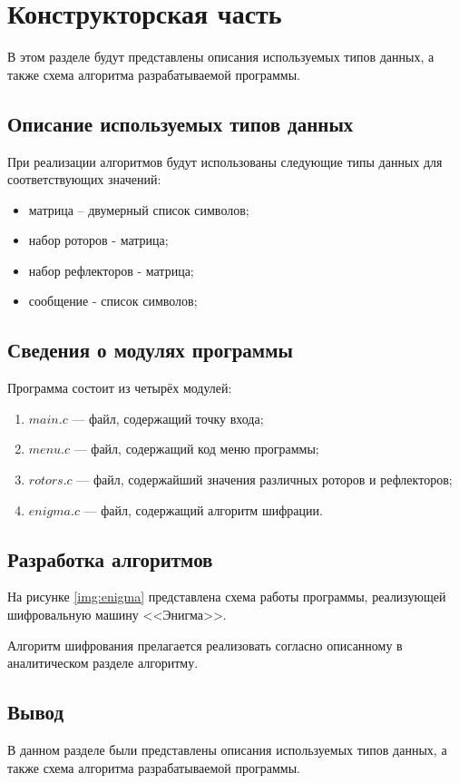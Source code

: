 \chapter{Конструкторская часть}
В этом разделе будут представлены описания используемых типов данных, а также схема алгоритма разрабатываемой программы.

\section{Описание используемых типов данных}

При реализации алгоритмов будут использованы следующие типы данных для соответствующих значений:
\begin{itemize}[label=---]
	\item матрица -- двумерный список символов;
	\item набор роторов  - матрица;
	\item набор рефлекторов - матрица;
	\item сообщение - список символов;
\end{itemize}


\section{Сведения о модулях программы}
Программа состоит из четырёх модулей:
\begin{enumerate}[label=\arabic*)]
	\item $main.c$ --- файл, содержащий точку входа;
    \item $menu.c$ --- файл, содержащий код меню программы;
    \item $rotors.c$ --- файл, содержайший значения различных роторов и рефлекторов;
    \item $enigma.c$ --- файл, содержащий алгоритм шифрации.
\end{enumerate}

\section{Разработка алгоритмов}
На рисунке \ref{img:enigma} представлена схема работы программы, реализующей шифровальную машину <<Энигма>>.


Алгоритм шифрования прелагается реализовать согласно описанному в аналитическом разделе алгоритму.

\section*{Вывод}

В данном разделе были представлены описания используемых типов данных, а также схема алгоритма разрабатываемой программы.
